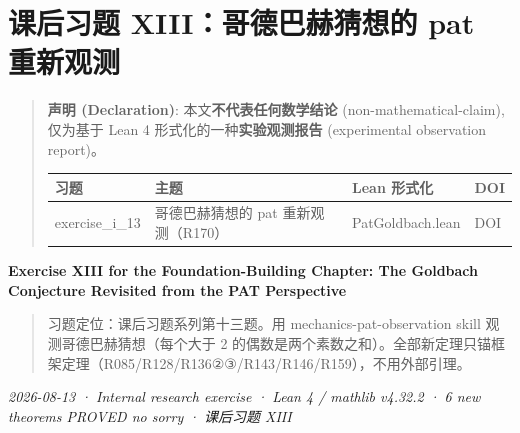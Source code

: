 \documentclass[
]{article}
\author{}
\date{}
\newcounter{none} %
\begin{document}
\section{课后习题 XIII：哥德巴赫猜想的 pat
重新观测}\label{ux7b51ux57faux7bc7ux8bfeux540eux4e60ux9898-xiiiux54e5ux5fb7ux5df4ux8d6bux731cux60f3ux7684-pat-ux91cdux65b0ux89c2ux6d4b}

\begin{quote}
\textbf{声明 (Declaration)}: 本文\textbf{不代表任何数学结论}
(non-mathematical-claim), 仅为基于 Lean 4
形式化的一种\textbf{实验观测报告} (experimental observation report)。

{\def\LTcaptype{none} %
\begin{longtable}[]{@{}
 >{\raggedright\arraybackslash}p{}
 >{\raggedright\arraybackslash}p{}
 >{\raggedright\arraybackslash}p{}
 >{\raggedright\arraybackslash}p{}@{}}
\toprule\noalign{}
\begin{minipage}[b]{\linewidth}\raggedright
习题
\end{minipage} & \begin{minipage}[b]{\linewidth}\raggedright
主题
\end{minipage} & \begin{minipage}[b]{\linewidth}\raggedright
Lean 形式化
\end{minipage} & \begin{minipage}[b]{\linewidth}\raggedright
DOI
\end{minipage} \\
\midrule\noalign{}
\endhead
\bottomrule\noalign{}
\endlastfoot
exercise\_i\_13 & 哥德巴赫猜想的 pat 重新观测（R170） & PatGoldbach.lean
& DOI \\
\end{longtable}
}
\end{quote}

\textbf{Exercise XIII for the Foundation-Building Chapter: The Goldbach
Conjecture Revisited from the PAT Perspective}

\begin{quote}
习题定位：课后习题系列第十三题。用 mechanics-pat-observation skill
观测哥德巴赫猜想（每个大于 2
的偶数是两个素数之和）。全部新定理只锚框架定理（R085/R128/R136②③/R143/R146/R159），不用外部引理。
\end{quote}

\emph{2026-08-13 · Internal research exercise · Lean 4 / mathlib v4.32.2
· 6 new theorems PROVED no sorry · 课后习题 XIII }
\end{document}
